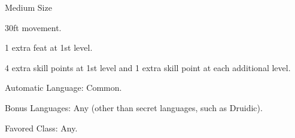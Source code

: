 
\begin{itemize*}
\item Medium Size
\item 30ft movement.
\item 1 extra feat at 1st level.
\item 4 extra skill points at 1st level and 1 extra skill point at each additional level.
\item Automatic Language: Common.
\item Bonus Languages: Any (other than secret languages, such as Druidic).
\item Favored Class: Any.
\end{itemize*}
